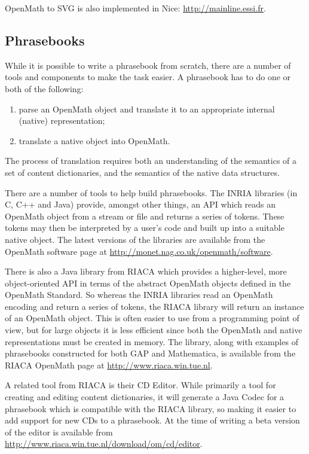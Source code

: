 \documentclass[report,keylogo]{openmath}
\begin{document}
OpenMath to SVG is also implemented in Nice:
\url{http://mainline.essi.fr}.

\subsection{Phrasebooks}

While it is possible to write a phrasebook from scratch, there are a
number of tools and components to make the task easier.  A phrasebook
has to do one or both of the following:
\begin{enumerate}
\item parse an OpenMath object and translate it to an appropriate
  internal (native) representation;
\item translate a native object into OpenMath.
\end{enumerate}
The process of translation requires both an understanding of the
semantics of a set of content dictionaries, and the semantics of the
native data structures.

There are a number of tools to help build phrasebooks.  The INRIA
libraries (in C, C++ and Java) provide, amongst other things, an API
which reads an OpenMath object from a stream or file and returns a
series of tokens.  These tokens may then be interpreted by a user's
code and built up into a suitable native object.  The latest versions
of the libraries are available from the OpenMath software page at
\url{http://monet.nag.co.uk/openmath/software}.

There is also a Java library from RIACA which provides a higher-level,
more object-oriented API in terms of the abstract OpenMath objects
defined in the OpenMath Standard.  So whereas the INRIA libraries read
an OpenMath encoding and return a series of tokens, the RIACA library
will return an instance of an OpenMath object.  This is often easier to
use from a programming point of view, but for large objects it is less
efficient since both the OpenMath and native representations must be
created in memory.  The library, along with examples of phrasebooks
constructed for both GAP and Mathematica, is available from the RIACA
OpenMath page at \url{http://www.riaca.win.tue.nl}.

A related tool from RIACA is their CD Editor.  While primarily a tool
for creating and editing content dictionaries, it will generate a Java
Codec for a phrasebook which is compatible with the RIACA library, so
making it easier to add support for new CDs to a phrasebook.  At the
time of writing a beta version of the editor is available from
\url{http://www.riaca.win.tue.nl/download/om/cd/editor}.
\end{document}
